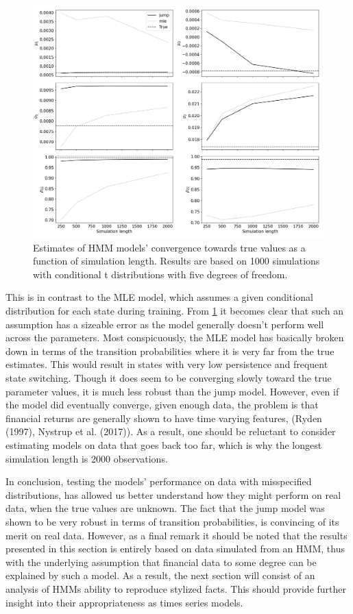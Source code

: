 \begin{figure}[H] 
    \centering
    \includegraphics[width=1\textwidth]{analysis/model_convergence/images/simulation_t.png}
    \caption{Estimates of HMM models' convergence towards true values as a function of simulation length. Results are based on 1000 simulations with conditional t distributions with five degrees of freedom.}
    \label{fig:jump_t}
\end{figure}

This is in contrast to the MLE model, which assumes a given conditional distribution for each state during training. From \cref{fig:jump_t} it becomes clear that such an assumption has a sizeable error as the model generally doesn't perform well across the parameters. Most conspicuously, the MLE model has basically broken down in terms of the transition probabilities where it is very far from the true estimates. This would result in states with very low persistence and frequent state switching. Though it does seem to be converging slowly toward the true parameter values, it is much less robust than the jump model. However, even if the model did eventually converge, given enough data, the problem is that financial returns are generally shown to have time varying features, (Ryden (1997), Nystrup et al. (2017)). As a result, one should be reluctant to consider estimating models on data that goes back too far, which is why the longest simulation length is 2000 observations.

In conclusion, testing the models' performance on data with misspecified distributions, has allowed us better understand how they might perform on real data, when the true values are unknown. The fact that the jump model was shown to be very robust in terms of transition probabilities, is convincing of its merit on real data. However, as a final remark it should be noted that the results presented in this section is entirely based on data simulated from an HMM, thus with the underlying assumption that financial data to some degree can be explained by such a model. As a result, the next section will consist of an analysis of HMMs ability to reproduce stylized facts. This should provide further insight into their appropriateness as times series models.

